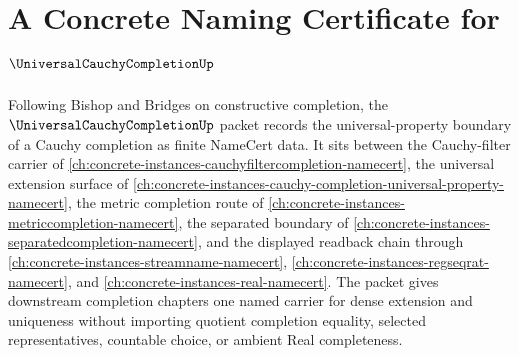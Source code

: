 \chapter{A Concrete Naming Certificate for $\UniversalCauchyCompletionUp$}
\label{ch:concrete-instances-universal-cauchy-completion-namecert}

Following Bishop and Bridges on constructive completion, the $\UniversalCauchyCompletionUp$ packet records the universal-property boundary of a Cauchy completion as finite NameCert data. It sits between the Cauchy-filter carrier of \autoref{ch:concrete-instances-cauchyfiltercompletion-namecert}, the universal extension surface of \autoref{ch:concrete-instances-cauchy-completion-universal-property-namecert}, the metric completion route of \autoref{ch:concrete-instances-metriccompletion-namecert}, the separated boundary of \autoref{ch:concrete-instances-separatedcompletion-namecert}, and the displayed readback chain through \autoref{ch:concrete-instances-streamname-namecert}, \autoref{ch:concrete-instances-regseqrat-namecert}, and \autoref{ch:concrete-instances-real-namecert}. The packet gives downstream completion chapters one named carrier for dense extension and uniqueness without importing quotient completion equality, selected representatives, countable choice, or ambient Real completeness.

